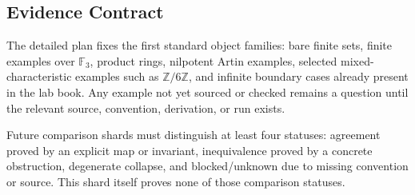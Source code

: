 \subsection{Evidence Contract}

The detailed plan fixes the first standard object families: bare finite sets,
finite examples over \(\mathbb F_3\), product rings, nilpotent Artin examples,
selected mixed-characteristic examples such as \(\mathbb Z/6\mathbb Z\), and
infinite boundary cases already present in the lab book.  Any example not yet
sourced or checked remains a question until the relevant source, convention,
derivation, or run exists.

Future comparison shards must distinguish at least four statuses: agreement
proved by an explicit map or invariant, inequivalence proved by a concrete
obstruction, degenerate collapse, and blocked/unknown due to missing
convention or source.  This shard itself proves none of those comparison
statuses.
